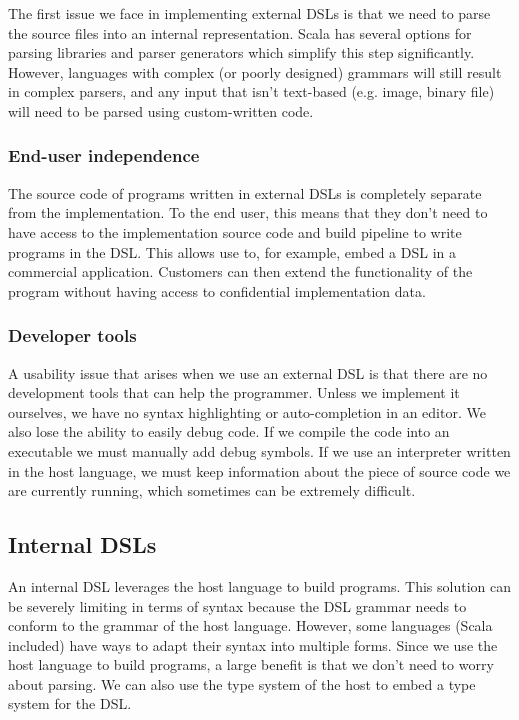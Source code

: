 The first issue we face in implementing external DSLs is that we need to parse the source files into an internal representation.
Scala has several options for parsing libraries and parser generators which simplify this step significantly.
However, languages with complex (or poorly designed) grammars will still result in complex parsers, and any input that isn't text-based (e.g. image, binary file) will need to be parsed using custom-written code.

\subsubsection{End-user independence}

The source code of programs written in external DSLs is completely separate from the implementation.
To the end user, this means that they don't need to have access to the implementation source code and build pipeline to write programs in the DSL.
This allows use to, for example, embed a DSL in a commercial application.
Customers can then extend the functionality of the program without having access to confidential implementation data.

\subsubsection{Developer tools}

A usability issue that arises when we use an external DSL is that there are no development tools that can help the programmer.
Unless we implement it ourselves, we have no syntax highlighting or auto-completion in an editor.
We also lose the ability to easily debug code.
If we compile the code into an executable we must manually add debug symbols.
If we use an interpreter written in the host language, we must keep information about the piece of source code we are currently running, which sometimes can be extremely difficult.

\subsection{Internal DSLs}

An internal DSL leverages the host language to build programs.
This solution can be severely limiting in terms of syntax because the DSL grammar needs to conform to the grammar of the host language.
However, some languages (Scala included) have ways to adapt their syntax into multiple forms.
Since we use the host language to build programs, a large benefit is that we don't need to worry about parsing.
We can also use the type system of the host to embed a type system for the DSL.

